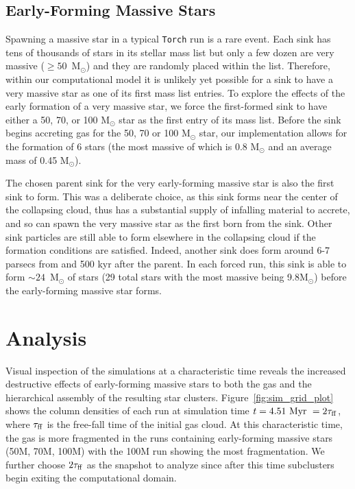 \documentclass[twoside]{drexel-thesis}
\begin{document}
\begin{thesis}
\subsection{Early-Forming Massive Stars}
Spawning a massive star in a typical \texttt{Torch} run is a rare event. Each sink has tens of thousands of stars in its stellar mass list but only a few dozen are very massive ($\ge50$~M$_{\odot}$) and they are randomly placed within the list. Therefore, within our computational model it is unlikely yet possible for a sink to have a very massive star as one of its first mass list entries. To explore the effects of the early formation of a very massive star, we force the first-formed sink to have either a 50, 70, or 100 M$_{\odot}$ star as the first entry of its mass list. 
Before the sink begins accreting gas for the 50, 70 or 100 M$_{\odot}$ star, our implementation allows for the formation of 6 stars (the most massive of which is 0.8 M$_\odot$ and an average mass of 0.45 M$_\odot$). 

The chosen parent sink for the very early-forming massive star is also the first sink to form. This was a deliberate choice, as this sink forms near the center of the collapsing cloud, thus has a substantial supply of infalling material to accrete, and so can spawn the very massive star as the first born from the sink. Other sink particles are still able to form elsewhere in the collapsing cloud if the formation conditions are satisfied. Indeed, another sink does form around 6-7 parsecs from and 500 kyr after the parent. In each forced run, this sink is able to form $\sim24$~M$_\odot$ of stars (29 total stars with the most massive being 9.8M$_\odot$) before the early-forming massive star forms.

\section{Analysis}\label{sec:p1-analysis}
Visual inspection of the simulations at a characteristic time reveals the increased destructive effects of early-forming massive stars to both the gas and the hierarchical assembly of the resulting star clusters. Figure~\ref{fig:sim_grid_plot} shows the column densities of each run at simulation time $t=4.51 \mbox{ Myr }= 2\tau_{\rm ff}$, where $\tau_{\rm ff}$ is the free-fall time of the initial gas cloud. At this characteristic time, the gas is more fragmented in the runs containing early-forming massive stars (50M, 70M, 100M) with the 100M run showing the most fragmentation. We further choose $2\tau_{\rm ff}$ as the snapshot to analyze since after this time subclusters begin exiting the computational domain.


\end{thesis}
\end{document}
